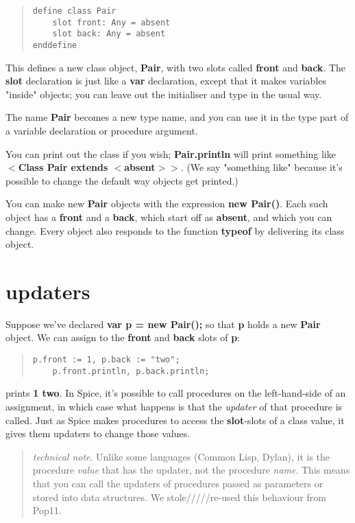 \documentclass{report}
\begin{document}
\begin{quote}
\begin{verbatim}
define class Pair
    slot front: Any = absent
    slot back: Any = absent
enddefine
\end{verbatim}
\end{quote}


This defines a new class object, {\bf Pair}, with two slots called {\bf front} and
{\bf back}. The {\bf slot} declaration is just like a {\bf var} declaration, except that
it makes variables "inside" objects; you can leave out the initialiser and
type in the usual way.

The name {\bf Pair} becomes a new type name, and you can use it in the type part
of a variable declaration or procedure argument.

You can print out the class if you wish; {\bf Pair.println} will print something
like {\bf $<$Class Pair extends $<$absent$>$$>$}. (We say "something like" because it's
possible to change the default way objects get printed.)

You can make new {\bf Pair} objects with the expression {\bf new Pair()}. Each such
object has a {\bf front} and a {\bf back}, which start off as {\bf absent}, and which you
can change. Every object also responds to the function {\bf typeof} by delivering
its class object.

\section{updaters}


Suppose we've declared {\bf var p = new Pair();} so that {\bf p} holds a new {\bf Pair}
object. We can assign to the {\bf front} and {\bf back} slots of {\bf p}:

\begin{quote}
\begin{verbatim}
p.front := 1, p.back := "two";
    p.front.println, p.back.println;
\end{verbatim}
\end{quote}


prints {\bf 1 two}. In Spice, it's possible to call procedures
on the left-hand-side of an assignment, in which case what happens is that
the {\em updater} of that procedure is called. Just as Spice makes procedures
to access the {\bf slot}-slots of a class value, it gives them updaters
to change those values.

\begin{quote}{\em technical note}. Unlike some languages (Common Lisp, Dylan), it is the
procedure {\em value} that has the updater, not the procedure {\em name}. This means
that you can call the updaters of procedures passed as parameters or stored
into data structures. We stole/////re-used this behaviour from Pop11.
\end{quote}
\end{document}

